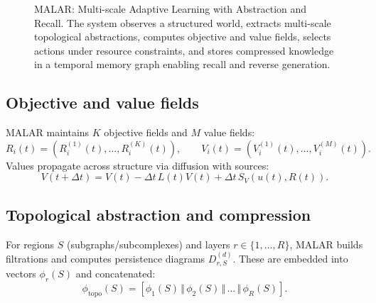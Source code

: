 \documentclass[11pt,english]{article}
\theoremstyle{remark}
\begin{document}
\begin{figure}[t]
	\caption{MALAR: Multi-scale Adaptive Learning with Abstraction and Recall. The system observes a structured world, extracts multi-scale topological abstractions, computes objective and value fields, selects actions under resource constraints, and stores compressed knowledge in a temporal memory graph enabling recall and reverse generation.}
	\label{fig:malar-overview}
\end{figure}

\subsection{Objective and value fields}
MALAR maintains $K$ objective fields and $M$ value fields:
\begin{equation}
R_i(t) = (R_i^{(1)}(t),\dots,R_i^{(K)}(t)), \qquad
V_i(t) = (V_i^{(1)}(t),\dots,V_i^{(M)}(t)).
\end{equation}
Values propagate across structure via diffusion with sources:
\begin{equation}
V(t+\Delta t) = V(t) - \Delta t\, L(t)V(t) + \Delta t\, S_V(u(t),R(t)).
\end{equation}


\subsection{Topological abstraction and compression}
For regions $S$ (subgraphs/subcomplexes) and layers $r\in\{1,\dots,R\}$, MALAR builds filtrations and computes
persistence diagrams $D_{r,S}^{(d)}$. These are embedded into vectors $\phi_r(S)$ and concatenated:
\begin{equation}
\phi_{\text{topo}}(S) = [\phi_1(S)\,\Vert\,\phi_2(S)\,\Vert\,\dots\,\Vert\,\phi_R(S)].
\end{equation}
\end{document}
